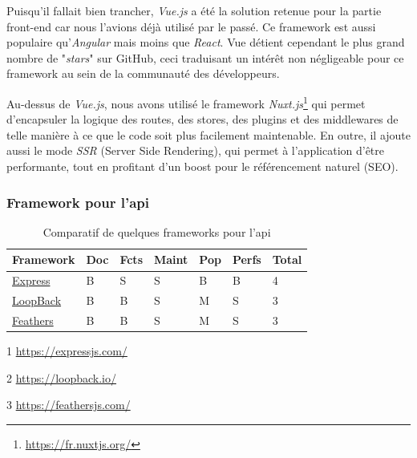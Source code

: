 Puisqu'il fallait bien trancher, \textit{Vue.js} a été la solution retenue pour la partie front-end car nous l'avions déjà utilisé par le passé. Ce framework est aussi populaire qu'\textit{Angular} mais moins que \textit{React}. Vue détient cependant le plus grand nombre de "\textit{stars}" sur GitHub, ceci traduisant un intérêt non négligeable pour ce framework au sein de la communauté des développeurs.\\

\renewcommand{\thefootnote}{\alph{footnote}}

Au-dessus de \textit{Vue.js}, nous avons utilisé le framework \textit{Nuxt.js}\footnote{\url{https://fr.nuxtjs.org/}} qui permet d'encapsuler la logique des routes, des stores, des plugins et des middlewares de telle manière à ce que le code soit plus facilement maintenable. En outre, il ajoute aussi le mode \textit{SSR} (Server Side Rendering), qui permet à l'application d'être performante, tout en profitant d'un boost pour le référencement naturel (SEO).

\renewcommand{\thefootnote}{\arabic{footnote}}

\subsubsection*{Framework pour l'\Gls{api}}


\begin{table}[H]
    \centering
    \begin{threeparttable}
    \begin{tabular}{| l | l | l | l | l | l | l |}
    \hline
        Framework & Doc & Fcts & Maint & Pop & Perfs & Total \\
    \hline
        \href{https://expressjs.com/}{Express}\tnote{1} &
        B &  
        S &
        S &            
        B &              
        B &
        4 \\
    \hline
        \href{https://loopback.io/}{LoopBack}\tnote{2} &
        B &                
        B &   
        S &
        M &              
        S &      
        3 \\
    \hline
        \href{https://feathersjs.com/}{Feathers}\tnote{3} &
        B &                
        B &     
        S &
        M &              
        S &       
        3 \\  
    \hline
    \end{tabular}
    \begin{tablenotes}
        \item[1] \url{https://expressjs.com/}
        \item[2] \url{https://loopback.io/}
        \item[3] \url{https://feathersjs.com/}
    \end{tablenotes}
    \end{threeparttable}
    \caption{Comparatif de quelques frameworks pour l'\Gls{api}}
    \label{table:compFrameworksAPI}
\end{table}

